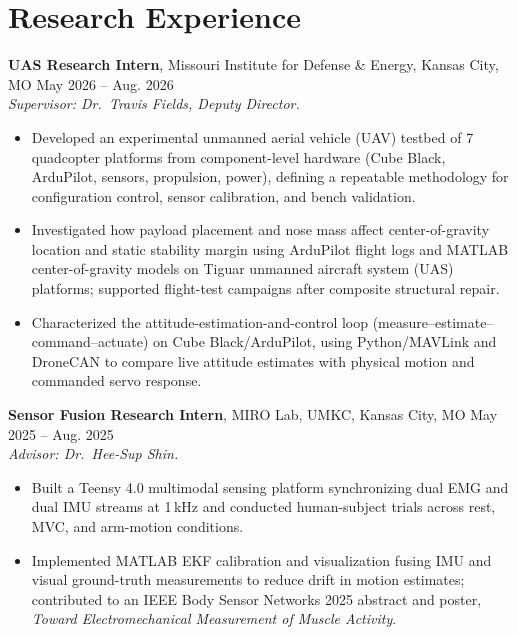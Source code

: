 \documentclass[11pt, letterpaper]{article}
\newcommand{\role}[5]{%
  \noindent\textbf{#1}, #2, #3, #4 \hfill #5%
}
\begin{document}
\section{Research Experience}
\role{UAS Research Intern}{Missouri Institute for Defense \& Energy}{Kansas City}{MO}{May 2026 -- Aug. 2026} \\[-2pt]
\textit{\small Supervisor: Dr.\ Travis Fields, Deputy Director.}
\begin{itemize}
\item Developed an experimental unmanned aerial vehicle (UAV) testbed of 7 quadcopter platforms from component-level hardware (Cube Black, ArduPilot, sensors, propulsion, power), defining a repeatable methodology for configuration control, sensor calibration, and bench validation.
\item Investigated how payload placement and nose mass affect center-of-gravity location and static stability margin using ArduPilot flight logs and MATLAB center-of-gravity models on Tiguar unmanned aircraft system (UAS) platforms; supported flight-test campaigns after composite structural repair.
\item Characterized the attitude-estimation-and-control loop (measure--estimate--command--actuate) on Cube Black/ArduPilot, using Python/MAVLink and DroneCAN to compare live attitude estimates with physical motion and commanded servo response.
\end{itemize}
\role{Sensor Fusion Research Intern}{MIRO Lab, UMKC}{Kansas City}{MO}{May 2025 -- Aug. 2025} \\[-2pt]
\textit{\small Advisor: Dr.\ Hee-Sup Shin.}
\begin{itemize}
\item Built a Teensy 4.0 multimodal sensing platform synchronizing dual EMG and dual IMU streams at 1\,kHz and conducted human-subject trials across rest, MVC, and arm-motion conditions.
\item Implemented MATLAB EKF calibration and visualization fusing IMU and visual ground-truth measurements to reduce drift in motion estimates; contributed to an IEEE Body Sensor Networks 2025 abstract and poster, \textit{Toward Electromechanical Measurement of Muscle Activity}.
\end{itemize}
\end{document}
